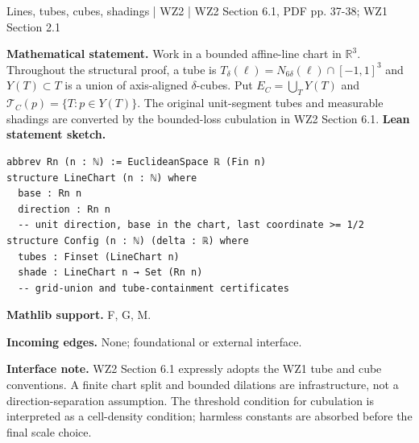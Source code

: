 \documentclass[10pt,a4paper]{article}
\begin{document}
\begin{minipage}{\linewidth}
\hypertarget{node-Igeom}{}
\begin{tcolorbox}[colback=white,colframe=apifg,colbacktitle=apibg,coltitle=ink,boxrule=0.45pt,arc=1.6mm,left=3mm,right=3mm,top=2mm,bottom=2mm,title={\sffamily\bfseries Geometry API \hfill \texttt{Igeom}}]
{\sffamily\small\color{muted}Lines, tubes, cubes, shadings | WZ2 | WZ2 Section 6.1, PDF pp. 37-38; WZ1 Section 2.1}\par
\textbf{Mathematical statement.} Work in a bounded affine-line chart in $\mathbb R^3$. Throughout the structural proof, a tube is
$T_\delta(\ell)=N_{6\delta}(\ell)\cap[-1,1]^3$ and $Y(T)\subset T$ is a union of axis-aligned $\delta$-cubes.
Put $E_C=\bigcup_TY(T)$ and $\mathcal T_C(p)=\{T:p\in Y(T)\}$.
The original unit-segment tubes and measurable shadings are converted by the bounded-loss cubulation in WZ2 Section 6.1.
\smallskip\textbf{Lean statement sketch.}
\begin{Verbatim}[fontsize=\small,breaklines=true,breakanywhere=true,tabsize=2]
abbrev Rn (n : ℕ) := EuclideanSpace ℝ (Fin n)
structure LineChart (n : ℕ) where
  base : Rn n
  direction : Rn n
  -- unit direction, base in the chart, last coordinate >= 1/2
structure Config (n : ℕ) (delta : ℝ) where
  tubes : Finset (LineChart n)
  shade : LineChart n → Set (Rn n)
  -- grid-union and tube-containment certificates
\end{Verbatim}
{\footnotesize\textbf{Mathlib support.} F, G, M.\par
\textbf{Incoming edges.} None; foundational or external interface.\par}
{\footnotesize\textbf{Interface note.} WZ2 Section 6.1 expressly adopts the WZ1 tube and cube conventions. A finite chart split and bounded dilations are infrastructure, not a direction-separation assumption. The threshold condition for cubulation is interpreted as a cell-density condition; harmless constants are absorbed before the final scale choice.}
\end{tcolorbox}\end{minipage}\par\medskip
\end{document}
